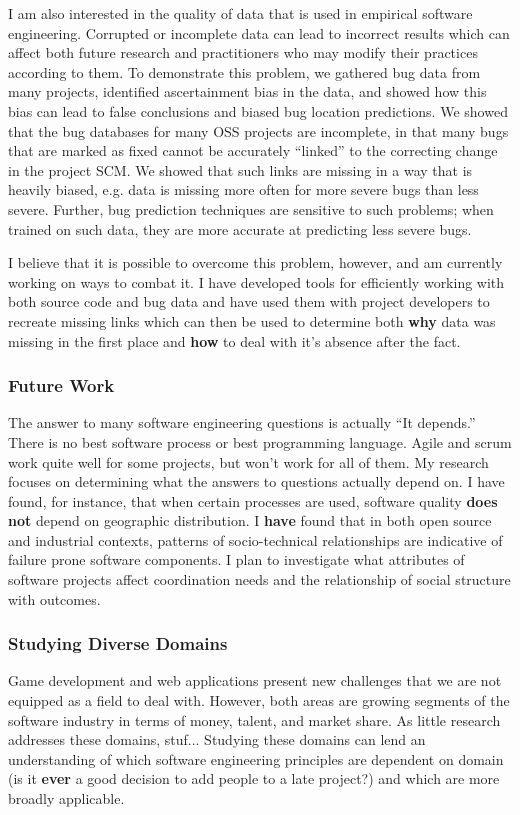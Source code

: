 \documentclass[10pt]{article}
\newcommand\Section[1]{\subsubsection*{\large #1}}
\newcommand\Subsection[1]{\subsubsection*{\small #1}}
\begin{document}
\begin{small}
I am also interested in the quality of data that is used in empirical software
engineering.  Corrupted or incomplete data can lead to incorrect results which
can affect both future research and practitioners who may modify their
practices according to them.  To demonstrate this problem, we gathered bug data
from many projects, identified ascertainment bias in the data, and showed how
this bias can lead to false conclusions and biased bug location predictions.
We showed that the bug databases for many OSS projects are incomplete, in that
many bugs that are marked as fixed cannot be accurately ``linked'' to the
correcting change in the project SCM.  We showed that such links are missing in
a way that is heavily biased, e.g. data is missing more often for more severe
bugs than less severe. Further, bug prediction techniques are sensitive
to such problems; when trained on such data, they are more accurate at predicting
less severe bugs.

I believe that it is possible to overcome this problem, however, and am
currently working on ways to combat it.  I have developed tools for efficiently
working with both source code and bug data and have used them with project
developers to recreate missing links which can then be used to determine both
\textbf{why} data was missing in the first place and \textbf{how} to deal with
it's absence after the fact.

\Section{Future Work}

The answer to many software engineering questions is actually
``It depends.'' There is no best software process or best programming
language.  Agile and scrum work quite well for some projects, but won't work for all
of them.  My research focuses on determining what the answers to questions
actually depend on.  I have found, for instance, that when certain processes
are used, software quality \textbf{does not} depend on geographic distribution.
I \textbf{have} found that in both open source and industrial contexts,
patterns of socio-technical relationships are indicative of failure prone
software components.  I plan to investigate what attributes of software
projects affect coordination needs and the relationship of social structure 
with outcomes.

\Subsection{Studying Diverse Domains}

Game development and web applications present new challenges that we are not
equipped as a field to deal with.  However, both areas are growing segments of
the software industry in terms of money, talent, and market share.  As little
research addresses these domains, stuf...  Studying these domains can lend an understanding
of which software engineering principles are dependent on domain  (is it \textbf{ever}
a good decision to add people to a late project?) and which are more broadly applicable.



\end{small}
\end{document}
